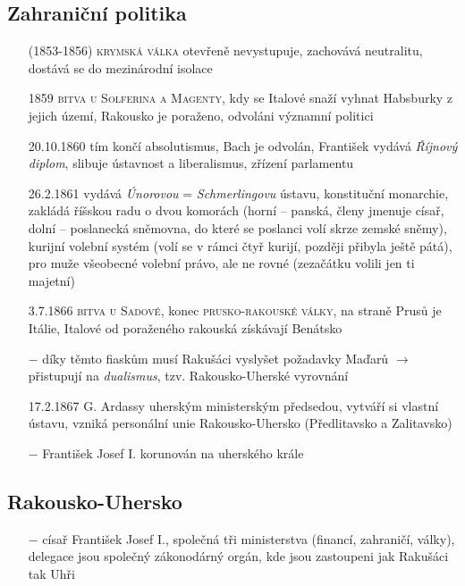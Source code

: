\documentclass{article}
\begin{document}
\subsection*{Zahraniční politika}
\begin{itemize}
    \vspace{-0.5em}
    \setlength\itemsep{0.15em}
    \item[(1853-1856)] \textsc{krymská válka} otevřeně nevystupuje, zachovává neutralitu, dostává se do mezinárodní isolace
    \item[1859] \textsc{bitva u Solferina a Magenty}, kdy se Italové snaží vyhnat Habsburky z jejich území, Rakousko je poraženo, odvoláni významní politici
    \item[20.10.1860] tím končí absolutismus, Bach je odvolán, František vydává \textit{Říjnový diplom}, slibuje ústavnost a liberalismus, zřízení parlamentu
    \item[26.2.1861] vydává \textit{Únorovou} = \textit{Schmerlingovu} ústavu, konstituční monarchie, zakládá říšskou radu o dvou komorách (horní -- panská, členy jmenuje císař, dolní -- poslanecká sněmovna, do které se poslanci volí skrze zemské sněmy), kurijní volební systém (volí se v rámci čtyř kurijí, později přibyla ještě pátá), pro muže všeobecné volební právo, ale ne rovné (zezačátku volili jen ti majetní)
    \item[3.7.1866] \textsc{bitva u Sadové}, konec \textsc{prusko-rakouské války}, na straně Prusů je Itálie, Italové od poraženého rakouská získávají Benátsko
    \item[$-$] díky těmto fiaskům musí Rakušáci vyslyšet požadavky Maďarů $\rightarrow$ přistupují na \textit{dualismus}, tzv. Rakousko-Uherské vyrovnání
    \item[17.2.1867] G. Ardassy uherským ministerským předsedou, vytváří si vlastní ústavu, vzniká personální unie Rakousko-Uhersko (Předlitavsko a Zalitavsko)
    \item[$-$] František Josef I. korunován na uherského krále
\end{itemize}

\subsection*{Rakousko-Uhersko}
\begin{itemize}
    \vspace{-0.5em}
    \setlength\itemsep{0.15em}
    \item[$-$] císař František Josef I., společná tři ministerstva (financí, zahraničí, války), delegace jsou společný zákonodárný orgán, kde jsou zastoupeni jak Rakušáci tak Uhři
\end{itemize}
\end{document}
